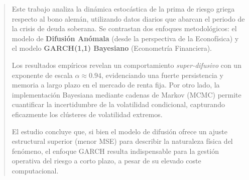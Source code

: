\begin{abstract}
Este trabajo analiza la dinámica estocástica de la prima de riesgo griega respecto al bono alemán, utilizando datos diarios que abarcan el periodo de la crisis de deuda soberana. Se contrastan dos enfoques metodológicos: el modelo de \textbf{Difusión Anómala} (desde la perspectiva de la Econofísica) y el modelo \textbf{GARCH(1,1) Bayesiano} (Econometría Financiera).

Los resultados empíricos revelan un comportamiento \textit{super-difusivo} con un exponente de escala $\alpha \approx 0.94$, evidenciando una fuerte persistencia y memoria a largo plazo en el mercado de renta fija. Por otro lado, la implementación Bayesiana mediante cadenas de Markov (MCMC) permite cuantificar la incertidumbre de la volatilidad condicional, capturando eficazmente los clústeres de volatilidad extremos.

El estudio concluye que, si bien el modelo de difusión ofrece un ajuste estructural superior (menor MSE) para describir la naturaleza física del fenómeno, el enfoque GARCH resulta indispensable para la gestión operativa del riesgo a corto plazo, a pesar de su elevado coste computacional.
\end{abstract}